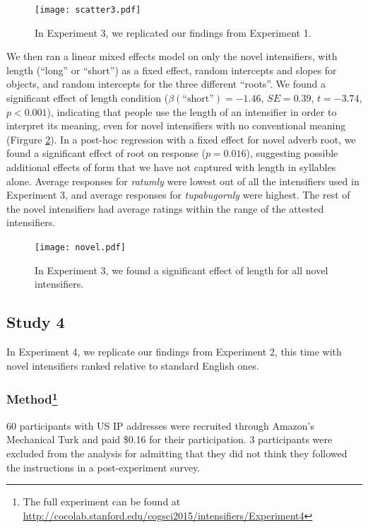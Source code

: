 \documentclass[10pt,letterpaper]{article}
\newcommand{\w}[1]{\emph{#1}}
\newcommand{\todo}[1]{{\color{red}#1}}
\begin{document}
\begin{figure}[hbt]
\begin{center}
\texttt{[image: scatter3.pdf]}
\end{center}
\caption{In Experiment 3, we replicated our findings from Experiment 1.} 
\label{exp3_replication}
\end{figure}

We then ran a linear mixed effects model on only the novel intensifiers, with length (``long'' or ``short'') as a fixed effect, random intercepts and slopes for objects, and random intercepts for the three different ``roots''. We found a significant effect of length condition ($\beta(\mbox{``short''})=-1.46$, $SE=0.39$, $t=-3.74$, $p<0.001$), indicating that people use the length of an intensifier in order to interpret its meaning, even for novel intensifiers with no conventional meaning (Firgure \ref{exp3_novel}).
In a post-hoc regression with a fixed effect for novel adverb root, we found a significant effect of root on response ($p=0.016$), suggesting possible additional effects of form that we have not captured with length in syllables alone. Average responses for \w{ratumly} were lowest out of all the intensifiers used in Experiment 3, and average responses for \w{tupabugornly} were highest. The rest of the novel intensifiers had average ratings within the range of the attested intensifiers.

\begin{figure}[hbt]
\begin{center}
\texttt{[image: novel.pdf]}
\end{center}
\caption{In Experiment 3, we found a significant effect of length for all novel intensifiers.} 
\label{exp3_novel}
\end{figure}



\subsection{Study 4 \label{sec:study4}}

In Experiment 4, we replicate our findings from Experiment 2, this time with novel intensifiers ranked relative to standard English ones.

\subsubsection{Method\footnote{The full experiment can be found at \url{http://cocolab.stanford.edu/cogsci2015/intensifiers/Experiment4}}}
60 participants with US IP addresses were recruited through Amazon's Mechanical Turk and paid \$0.16 for their participation. 3 participants were excluded from the analysis for admitting that they did not think they followed the instructions in a post-experiment survey.
\end{document}
